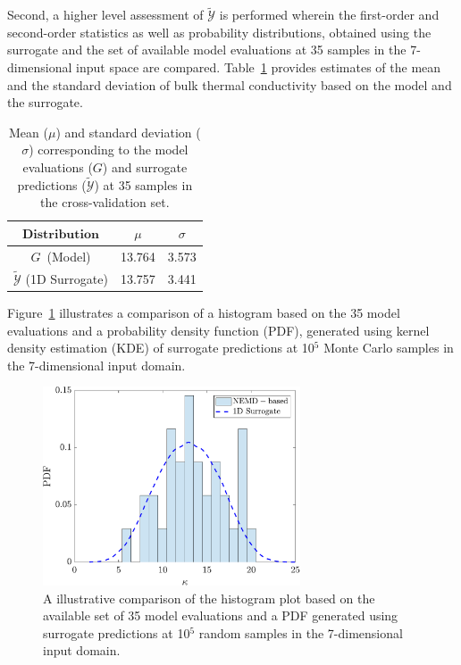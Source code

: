Second, a higher level assessment of $\tilde{\mathcal{Y}}$ is performed wherein
the first-order and second-order 
statistics as well as probability distributions, obtained using the
surrogate and the set of available model evaluations at 35 samples in the 7-dimensional
input space are compared. Table~\ref{tab:verify} provides estimates of the
mean and the standard deviation of bulk thermal conductivity based on the model and the
surrogate. 
%
\begin{table}[htbp]
\begin{center}
\begin{tabular}{ccc}
\toprule
$\textbf{Distribution}$ & $\mu$ & $\sigma$ \\ 
\bottomrule
$G$~(Model) & 13.764 & 3.573 \\
$\tilde{\mathcal{Y}}$ (1D Surrogate) & 13.757 & 3.441 \\
\bottomrule
\end{tabular}
\end{center}
\caption{Mean ($\mu$) and standard deviation ($\sigma$) corresponding to
the model evaluations ($G$) and surrogate predictions ($\tilde{\mathcal{Y}}$)
at 35 samples in the cross-validation set.}
\label{tab:verify}
\end{table}
%
Figure~\ref{fig:level2} illustrates a comparison of a histogram based on the 35 model evaluations
and a probability density function (PDF), generated using kernel density estimation (KDE)
of surrogate predictions at 10$^5$ Monte Carlo samples in the 7-dimensional input domain. 
\begin{figure}[htbp]
\begin{center}
\includegraphics[width=3.0in]{./Figures/free_pdf_comp_SSP1D}
\end{center} 
\caption{A illustrative comparison of the histogram plot based on the
available set of 35 model evaluations and a PDF generated using surrogate predictions at 10$^5$
random samples in the 7-dimensional input domain.}  
\label{fig:level2}
\end{figure}
